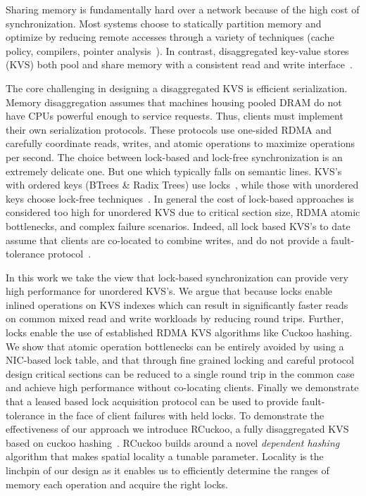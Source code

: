 Sharing memory is fundamentally hard over a network because of the high cost of synchronization.
Most systems choose to statically partition memory and optimize by reducing remote accesses through
a variety of techniques (cache policy, compilers, pointer
analysis~\cite{kona,mira,aifm,trackfm,carbink}). In contrast, disaggregated key-value stores (KVS) both
pool and share memory with a consistent read and write
interface~\cite{rolex,smart,ditto,fusee,clover,sherman,ford}.

The core challenging in designing a disaggregated KVS is efficient serialization. Memory
disaggregation assumes that machines housing pooled DRAM do not have CPUs powerful enough to service
requests. Thus, clients must implement their own serialization protocols. These protocols use
one-sided RDMA and carefully coordinate reads, writes, and atomic operations to maximize operations
per second.  The choice between lock-based and lock-free synchronization is an extremely delicate
one. But one which typically falls on semantic lines. KVS's with ordered keys (BTrees \& Radix
Trees) use locks~\cite{sherman,smart}, while those with unordered keys choose lock-free
techniques~\cite{rolex,ditto,fusee,clover}. In general the cost of lock-based approaches is
considered too high for unordered KVS due to critical section size, RDMA atomic bottlenecks, and
complex failure scenarios. Indeed, all lock based KVS's to date assume that clients are co-located
to combine writes, and do not provide a fault-tolerance protocol~\cite{sherman,smart}.

In this work we take the view that lock-based synchronization can provide very high performance for
unordered KVS's. We argue that because locks enable inlined operations on KVS indexes which can
result in significantly faster reads on common mixed read and write workloads by reducing round
trips. Further, locks enable the use of established RDMA KVS algorithms like Cuckoo hashing. We show
that atomic operation bottlenecks can be entirely avoided by using a NIC-based lock table, and that
through fine grained locking and careful protocol design critical sections can be reduced to a
single round trip in the common case and achieve high performance without co-locating clients.
Finally we demonstrate that a leased based lock acquisition protocol can be used to provide
fault-tolerance in the face of client failures with held locks.  To demonstrate the effectiveness of
our approach we introduce RCuckoo, a fully disaggregated KVS based on cuckoo hashing~\cite{cuckoo}.
RCuckoo builds around a novel \emph{dependent hashing} algorithm that makes spatial locality a
tunable parameter. Locality is the linchpin of our design as it enables us to efficiently determine
the ranges of memory each operation and acquire the right locks.



